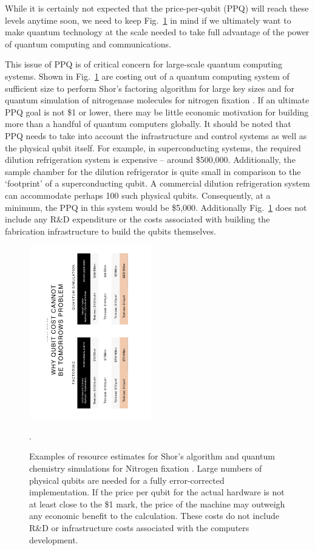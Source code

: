 \documentclass[twocolumn, aps, rmp, amsmath, amssymb, nofootinbib, superscriptaddress, longbibliography, floatfix, table-of-contents, eqsecnum]{revtex4-2}
\begin{document}
While it is certainly not expected that the price-per-qubit (PPQ) will reach these levels anytime soon, we need to keep Fig.~\ref{fig:price} in mind if we ultimately want to make quantum technology at the scale needed to take full advantage of the power of quantum computing and communications. 

This issue of PPQ is of critical concern for large-scale quantum computing systems. Shown in Fig.~\ref{fig:price} are costing out of a quantum computing system of sufficient size to perform Shor's factoring algorithm for large key sizes and for quantum simulation of nitrogenase molecules for nitrogen fixation \cite{SD-Fowler:2012aa,SD-Reiher:2017aa}. If an ultimate PPQ goal is not \$1 or lower, there may be little economic motivation for building more than a handful of quantum computers globally. It should be noted that PPQ needs to take into account the infrastructure and control systems as well as the physical qubit itself. For example, in superconducting systems, the required dilution refrigeration system is expensive -- around \$500,000. Additionally, the sample chamber for the dilution refrigerator is quite small in comparison to the `footprint' of a superconducting qubit. A commercial dilution refrigeration system can accommodate perhaps 100 such physical qubits. Consequently, at a minimum, the PPQ in this system would be \$5,000. Additionally Fig.~\ref{fig:price} does not include any R\&D expenditure or the costs associated with building the fabrication infrastructure to build the qubits themselves. 

\begin{figure}[htbp!]
	\includegraphics[clip=true, width=0.475\textwidth]{PPQ}
	\caption{Examples of resource estimates for Shor's algorithm \cite{SD-Fowler:2012aa} and quantum chemistry simulations for Nitrogen fixation \cite{SD-Reiher:2017aa}.  Large numbers of physical qubits are needed for a fully error-corrected implementation.  If the price per qubit for the actual hardware is not at least close to the \$1 mark, the price of the machine may outweigh any economic benefit to the calculation.  These costs do not include R\&D or infrastructure costs associated with the computers development.} \label{fig:price}.
\end{figure}
\end{document}
